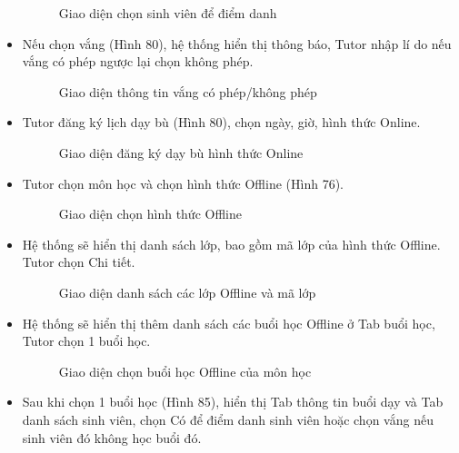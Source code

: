 \begin{itemize}
\begin{figure}[H]
    \caption{Giao diện chọn sinh viên để điểm danh}
    \end{figure}
    \item Nếu chọn vắng (Hình 80), hệ thống hiển thị thông báo, Tutor nhập lí do nếu vắng có phép ngược lại chọn không phép.
    \begin{figure}[H]
    \centering
    \setlength{\fboxsep}{2pt}     
    \setlength{\fboxrule}{0.5pt}   
    \caption{Giao diện thông tin vắng có phép/không phép}
    \end{figure}
    \item Tutor đăng ký lịch dạy bù (Hình 80), chọn ngày, giờ, hình thức Online. 
    \begin{figure}[H]
    \centering
    \setlength{\fboxsep}{2pt}     
    \setlength{\fboxrule}{0.5pt}   
    \caption{Giao diện đăng ký dạy bù hình thức Online}
    \end{figure}
    \item Tutor chọn môn học và chọn hình thức Offline (Hình 76).
    \begin{figure}[H]
    \centering
    \setlength{\fboxsep}{2pt}     
    \setlength{\fboxrule}{0.5pt}   
    \caption{Giao diện chọn hình thức Offline}
    \end{figure}
    \item Hệ thống sẽ hiển thị danh sách lớp, bao gồm mã lớp của hình thức Offline. Tutor chọn Chi tiết.
    \begin{figure}[H]
    \centering
    \setlength{\fboxsep}{2pt}     
    \setlength{\fboxrule}{0.5pt}   
    \caption{Giao diện danh sách các lớp Offline và mã lớp}
    \end{figure}
    \item Hệ thống sẽ hiển thị thêm danh sách các buổi học Offline ở Tab buổi học, Tutor chọn 1 buổi học.
    \begin{figure}[H]
    \centering
    \setlength{\fboxsep}{2pt}     
    \setlength{\fboxrule}{0.5pt}   
    \caption{Giao diện chọn buổi học Offline của môn học}
    \end{figure}
    \item Sau khi chọn 1 buổi học (Hình 85), hiển thị Tab thông tin buổi dạy và Tab danh sách sinh viên, chọn Có để điểm danh sinh viên hoặc chọn vắng nếu sinh viên đó không học buổi đó.

\end{itemize}
